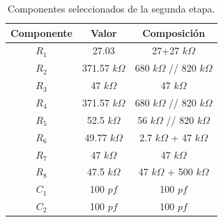 \begin{multicols}{2}
\begin{table}[H]
\centering
\begin{tabular}{ccc}
\hline
\multicolumn{1}{c}{Componente} & \multicolumn{1}{c}{Valor} & Composición  \\ \hline
$R_1$                           & 27.03                      & 27+27 $k\Omega$      \\
$R_2$                           & 371.57 $k\Omega$                    & 680 $k\Omega$ // 820 $k\Omega$ \\
$R_3$                           & 47 $k\Omega$                        & 47 $k\Omega$          \\
$R_4$                           & 371.57 $k\Omega$                    & 680 $k\Omega$ // 820 $k\Omega$   \\
$R_5$                           & 52.5 $k\Omega$                      & 56 $k\Omega$ // 820 $k\Omega$    \\
$R_6$                           & 49.77 $k\Omega$                     & 2.7 $k\Omega$ + 47 $k\Omega$     \\
$R_7$                           & 47 $k\Omega$                        & 47 $k\Omega$          \\
$R_8$                           & 47.5 $k\Omega$                        & 47 $k\Omega$ + 500 $k\Omega$          \\
$C_1$                           & 100 $pf$                       & 100 $pf$         \\
$C_2$ 							& 100 $pf$                       & 100 $pf$          \\
\hline
\end{tabular}
\caption{Componentes seleccionados de la segunda etapa.}
\end{table}
\end{multicols}

